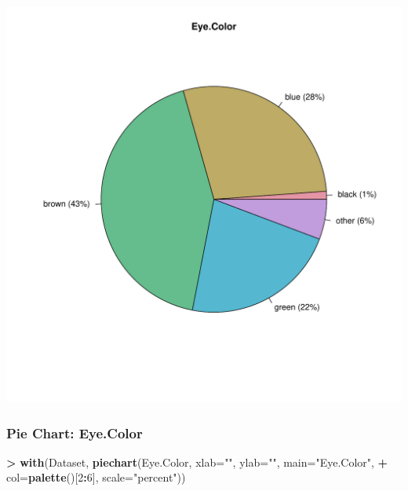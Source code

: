 \documentclass[
]{article}
\newenvironment{Shaded}{\begin{snugshade}}{\end{snugshade}}
\newcommand{\AttributeTok}[1]{\textcolor[rgb]{0.13,0.29,0.53}{#1}}
\newcommand{\DecValTok}[1]{\textcolor[rgb]{0.00,0.00,0.81}{#1}}
\newcommand{\FunctionTok}[1]{\textcolor[rgb]{0.13,0.29,0.53}{\textbf{#1}}}
\newcommand{\NormalTok}[1]{#1}
\newcommand{\SpecialCharTok}[1]{\textcolor[rgb]{0.81,0.36,0.00}{\textbf{#1}}}
\newcommand{\StringTok}[1]{\textcolor[rgb]{0.31,0.60,0.02}{#1}}
\begin{document}
\includegraphics[width=750px]{RcmdrMarkdown_files/figure-latex/unnamed-chunk-20-1}

\subsubsection{Pie Chart: Eye.Color}\label{pie-chart-eye.color-1}

\begin{Shaded}
\begin{Highlighting}[]
\SpecialCharTok{\textgreater{}} \FunctionTok{with}\NormalTok{(Dataset, }\FunctionTok{piechart}\NormalTok{(Eye.Color, }\AttributeTok{xlab=}\StringTok{""}\NormalTok{, }\AttributeTok{ylab=}\StringTok{""}\NormalTok{, }\AttributeTok{main=}\StringTok{"Eye.Color"}\NormalTok{, }
\SpecialCharTok{+}   \AttributeTok{col=}\FunctionTok{palette}\NormalTok{()[}\DecValTok{2}\SpecialCharTok{:}\DecValTok{6}\NormalTok{], }\AttributeTok{scale=}\StringTok{"percent"}\NormalTok{))}
\end{Highlighting}
\end{Shaded}
\end{document}
